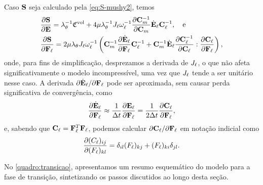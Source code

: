 \documentclass[Tese.tex]{subfiles}
\begin{document}
Caso $\S$ seja calculado pela \cref{eq:S-mushy2}, temos
\begin{align}
&\dfrac{\partial\S}{\partial\E} = \alongTermico^{-1}\CCvol + 4\viscfluid\alongTermico^{-1}\Jl\liquidMultiplier^{-1}\dfrac{\partial\Cm^{-1}}{\partial\Cm}\dotEl\Cl^{-1}, \text{\quad e} \label{eq:dS_dE2}\\
&\dfrac{\partial\S}{\partial\Fl} = 2\viscfluid\alongTermico\Jl\liquidMultiplier^{-1}\left(\Cm^{-1}\dfrac{\partial\dotEl}{\partial\Fl}\Cl^{-1} + \Cm^{-1}\dotEl\dfrac{\partial\Cl^{-1}}{\partial\Cl}:\dfrac{\partial\Cl}{\partial\Fl}\right),\label{eq:dS_dFl2}
\end{align}
onde, para fins de simplificação, desprezamos a derivada de $\Jl$, o que não afeta significativamente o modelo incompressível, uma vez que $\Jl$ tende a ser unitário nesse caso. A derivada ${\partial\dotEl}/{\partial\Fl}$ pode ser aproximada, sem causar perda significativa de convergência, como
\begin{equation}
\dfrac{\partial\dotEl}{\partial\Fl} \approx \dfrac{1}{\Delta t}\dfrac{\partial\El}{\partial\Fl} = \dfrac{1}{2\Delta t}\dfrac{\partial\Cl}{\partial\Fl},
\end{equation}
e, sabendo que $\Cl=\Fl^T\Fl$, podemos calcular ${\partial\Cl}/{\partial\Fl}$ em notação indicial como
\begin{equation}
\dfrac{\partial(\Clind)_{ij}}{\partial(\Flind)_{kl}} = \delta_{il}(\Flind)_{kj} + (\Flind)_{ki}\delta_{jl}.
\end{equation}

No \autoref{quadro:transicao}, apresentamos um resumo esquemático do modelo para a fase de transição, sintetizando os passos discutidos ao longo desta seção.
\end{document}
